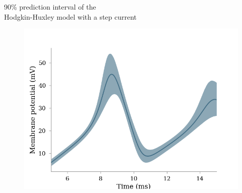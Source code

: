 \documentclass[presentation]{beamer}
\begin{document}
\begin{frame}{90\% prediction interval of the \\ Hodgkin-Huxley model with a step current}
  \vspace{-5mm}
  \begin{figure}
    \includegraphics[width=1\textwidth]{hh_prediction.png}
  \end{figure}

\end{frame}










\end{document}
